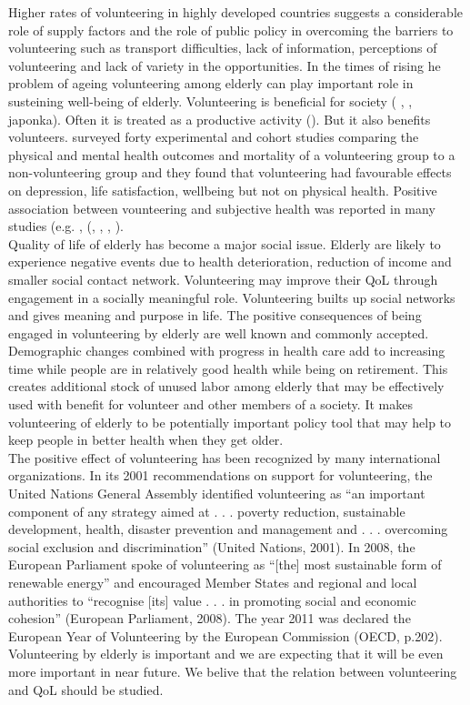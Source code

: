 \documentclass[10pt, letterpaper]{article}
\begin{document}
\begin{spacing}{1.4}
Higher rates of volunteering in  highly developed countries suggests a considerable role of supply factors and the role of public policy in overcoming the barriers to volunteering such as transport difficulties, lack of information, perceptions of volunteering and lack of variety in the opportunities. In the times of rising he problem of ageing volunteering among elderly can play important role in susteining well-being of elderly. Volunteering is beneficial for society ( \citet{Oecd15}, \cite{prouteau06}, japonka). Often it is treated as a productive activity (\citet{hank09}). But it also benefits volunteers. \citet{jenkinson2013volunteering} surveyed forty experimental and cohort studies comparing the physical and mental health outcomes and mortality of a volunteering group to a non-volunteering group and they found that volunteering had favourable effects on depression, life satisfaction, wellbeing but not on physical health. Positive association between vounteering and subjective health was reported in many studies (e.g. \citet{borgonovi08}, (\cite{anderson14}, \cite{li06}, \cite{VanWilligen00}, \citet{detollenaere17}). \\

Quality of life of elderly has become a major social issue. Elderly are likely to experience negative events due to health deterioration, reduction of income and smaller social contact network. Volunteering may improve their QoL through engagement in a socially meaningful role. Volunteering builts up social networks and gives meaning and purpose in life. The positive consequences of being engaged in volunteering by elderly are well known and commonly accepted. Demographic changes combined with progress in health care add to increasing time while people are in relatively good health while being on retirement. This creates additional  stock of unused labor among elderly that may be effectively used with benefit for volunteer and other members of a society.  It makes   volunteering of elderly to be potentially important policy tool that may help to keep people in better health when they get older. \\

The positive effect of volunteering has been recognized by many international organizations. In its 2001 recommendations on support for volunteering, the United Nations General Assembly identified volunteering as “an important
component of any strategy aimed at . . . poverty reduction, sustainable development, health, disaster prevention and management and . . . overcoming social exclusion and discrimination” (United Nations, 2001). In 2008, the European Parliament spoke of volunteering as “[the] most sustainable form of renewable energy” and encouraged Member States and regional and local authorities to “recognise
[its] value . . . in promoting social and economic cohesion” (European Parliament, 2008). The year 2011 was declared the European Year of Volunteering by the European Commission (OECD, p.202). Volunteering by elderly is important and we are expecting that it will be even more important in near future. We belive that the relation between volunteering and QoL should be studied. \\


\end{spacing}
\end{document}
